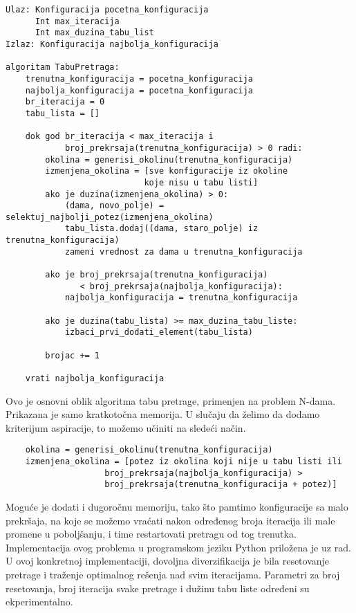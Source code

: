 \documentclass[a4paper]{article}
\begin{document}
\begin{lstlisting}
Ulaz: Konfiguracija pocetna_konfiguracija
      Int max_iteracija
      Int max_duzina_tabu_list
Izlaz: Konfiguracija najbolja_konfiguracija

algoritam TabuPretraga:
    trenutna_konfiguracija = pocetna_konfiguracija
    najbolja_konfiguracija = pocetna_konfiguracija
    br_iteracija = 0
    tabu_lista = []
    
    dok god br_iteracija < max_iteracija i
            broj_prekrsaja(trenutna_konfiguracija) > 0 radi:
        okolina = generisi_okolinu(trenutna_konfiguracija)
        izmenjena_okolina = [sve konfiguracije iz okoline 
                            koje nisu u tabu listi]
        ako je duzina(izmenjena_okolina) > 0:
            (dama, novo_polje) = selektuj_najbolji_potez(izmenjena_okolina)
            tabu_lista.dodaj((dama, staro_polje) iz trenutna_konfiguracija)
            zameni vrednost za dama u trenutna_konfiguracija
            
        ako je broj_prekrsaja(trenutna_konfiguracija) 
               < broj_prekrsaja(najbolja_konfiguracija):
            najbolja_konfiguracija = trenutna_konfiguracija
        
        ako je duzina(tabu_lista) >= max_duzina_tabu_liste:
            izbaci_prvi_dodati_element(tabu_lista)
            
        brojac += 1
    
    vrati najbolja_konfiguracija
\end{lstlisting}

Ovo je osnovni oblik algoritma tabu pretrage, primenjen na problem N-dama. Prikazana je samo kratkotočna memorija. U slučaju da želimo da dodamo kriterijum aspiracije, to možemo učiniti na sledeći način.

\begin{lstlisting}
    okolina = generisi_okolinu(trenutna_konfiguracija)
    izmenjena_okolina = [potez iz okolina koji nije u tabu listi ili 
                    broj_prekrsaja(najbolja_konfiguracija) >
                    broj_prekrsaja(trenutna_konfiguracija + potez)]
\end{lstlisting}

Moguće je dodati i dugoročnu memoriju, tako što pamtimo konfiguracije sa malo prekršaja, na koje se možemo vraćati nakon određenog broja iteracija ili male promene u poboljšanju, i time restartovati pretragu od tog trenutka. Implementacija ovog problema u programskom jeziku Python priložena je uz rad. U ovoj konkretnoj implementaciji, dovoljna diverzifikacija je bila resetovanje pretrage i traženje optimalnog rešenja nad svim iteracijama. Parametri za broj resetovanja, broj iteracija svake pretrage i dužinu tabu liste određeni su ekperimentalno.
\end{document}

